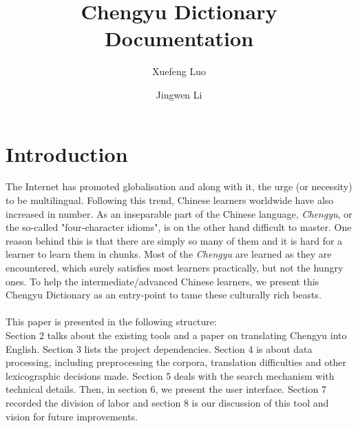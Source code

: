 \documentclass[11pt]{article} %
\title{Chengyu Dictionary Documentation} %
\author{Xuefeng Luo \and Jingwen Li}
\date{}	%
\begin{document}
\maketitle

\section{Introduction}
\indent The Internet has promoted globalisation and along with it, the urge (or necessity) to be multilingual. Following this trend, Chinese learners worldwide have also increased in number. As an inseparable part of the Chinese language, \textit{Chengyu}, or the so-called "four-character idioms", is on the other hand difficult to master. One reason behind this is that there are simply so many of them and it is hard for a learner to learn them in chunks. Most of the \textit{Chengyu} are learned as they are encountered, which surely satisfies most learners practically, but not the hungry ones. To help the intermediate/advanced Chinese learners, we present this Chengyu Dictionary as an entry-point to tame these culturally rich beasts.\\
\\
\indent This paper is presented in the following structure:\\
Section 2 talks about the existing tools and a paper on translating Chengyu into English. Section 3 lists the project dependencies. Section 4 is about data processing, including preprocessing the corpora, translation difficulties and other lexicographic decisions made. Section 5 deals with the search mechanism with technical details. Then, in section 6, we present the user interface. Section 7 recorded the division of labor and section 8 is our discussion of this tool and vision for future improvements.
\end{document}
